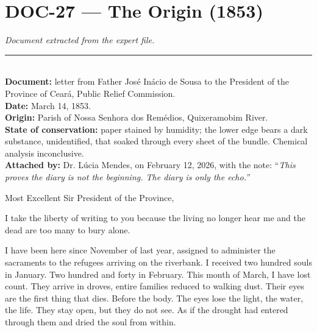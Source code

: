 \section*{\textbf{DOC-27} --- The Origin (1853)}

\noindent \textit{Document extracted from the expert file.}

\vspace{0.5em}\noindent\rule{\textwidth}{0.5pt}\vspace{0.5em}


\\[-0.2em]

\noindent\textbf{Document:} letter from Father José Inácio de Sousa to the President of the Province of Ceará, Public Relief Commission.\\
\noindent\textbf{Date:} March 14, 1853.\\
\noindent\textbf{Origin:} Parish of Nossa Senhora dos Remédios, Quixeramobim River.\\
\noindent\textbf{State of conservation:} paper stained by humidity; the lower edge bears a dark substance, unidentified, that soaked through every sheet of the bundle. Chemical analysis inconclusive.\\
\noindent\textbf{Attached by:} Dr. Lúcia Mendes, on February 12, 2026, with the note: \textquotedblleft{\textit{This proves the diary is not the beginning. The diary is only the echo.\textquotedblright{}}}

\noindent Most Excellent Sir President of the Province,

\noindent I take the liberty of writing to you because the living no longer hear me and the dead are too many to bury alone.

\noindent I have been here since November of last year, assigned to administer the sacraments to the refugees arriving on the riverbank. I received two hundred souls in January. Two hundred and forty in February. This month of March, I have lost count. They arrive in droves, entire families reduced to walking dust. Their eyes are the first thing that dies. Before the body. The eyes lose the light, the water, the life. They stay open, but they do not see. As if the drought had entered through them and dried the soul from within.

